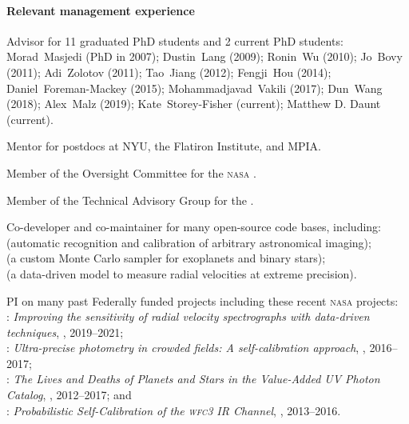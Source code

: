 \documentclass[12pt]{article}
\begin{document}
\paragraph{Relevant management experience}
\begin{list}{}{\hogglist}
\item
Advisor for 11 graduated PhD students and 2 current PhD students:
Morad~Masjedi (PhD in 2007);
Dustin~Lang (2009);
Ronin~Wu (2010);
Jo~Bovy (2011);
Adi~Zolotov (2011);
Tao~Jiang (2012);
Fengji~Hou (2014);
Daniel~Foreman-Mackey (2015);
Mohammadjavad~Vakili (2017);
Dun~Wang (2018);
Alex~Malz (2019);
Kate~Storey-Fisher (current);
Matthew D. Daunt (current).
\item
Mentor for postdocs at NYU, the Flatiron Institute, and MPIA.
\item
Member of the Oversight Committee for the \textsc{nasa} .
\item
Member of the Technical Advisory Group for the .
\item
Co-developer and co-maintainer for many open-source code bases,
including:\\
 (automatic recognition and calibration of arbitrary astronomical imaging);\\
 (a custom Monte Carlo sampler for exoplanets and binary stars);\\
 (a data-driven model to measure radial velocities at extreme precision).
\item
PI on many past Federally funded projects including these recent
\textsc{nasa} projects:\\
: 
\textit{Improving the sensitivity of radial velocity spectrographs with
data-driven techniques},
, 2019--2021;\\
:
\textit{Ultra-precise photometry in crowded fields: A self-calibration approach},
, 2016--2017;\\
:
\textit{The Lives and Deaths of Planets and Stars in the Value-Added UV Photon Catalog},
, 2012--2017; and\\
:
\textit{Probabilistic Self-Calibration of the \textsc{wfc3} IR Channel},
, 2013--2016.
\end{list}

\hypersetup{linkcolor=black}%
\end{document}
